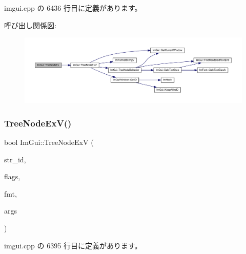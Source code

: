  imgui.\+cpp の 6436 行目に定義があります。

呼び出し関係図\+:\nopagebreak
\begin{figure}[H]
\begin{center}
\leavevmode
\includegraphics[width=350pt]{namespace_im_gui_adce362ad94baa9b00f5914cbcab00452_cgraph}
\end{center}
\end{figure}
\mbox{\label{namespace_im_gui_a251cd4acbdad4cef2246d9b573a83ce0}} 
\subsubsection{\texorpdfstring{Tree\+Node\+Ex\+V()}{TreeNodeExV()}\hspace{0.1cm}{\footnotesize\ttfamily [1/2]}}
{\footnotesize\ttfamily bool Im\+Gui\+::\+Tree\+Node\+ExV (\begin{DoxyParamCaption}\item[{const char $\ast$}]{str\+\_\+id,  }\item[{\mbox{\hyperlink{imgui_8h_a0588fdd10c59b49a0159484fe9ec4564}{Im\+Gui\+Tree\+Node\+Flags}}}]{flags,  }\item[{const char $\ast$}]{fmt,  }\item[{va\+\_\+list}]{args }\end{DoxyParamCaption})}



 imgui.\+cpp の 6395 行目に定義があります。

